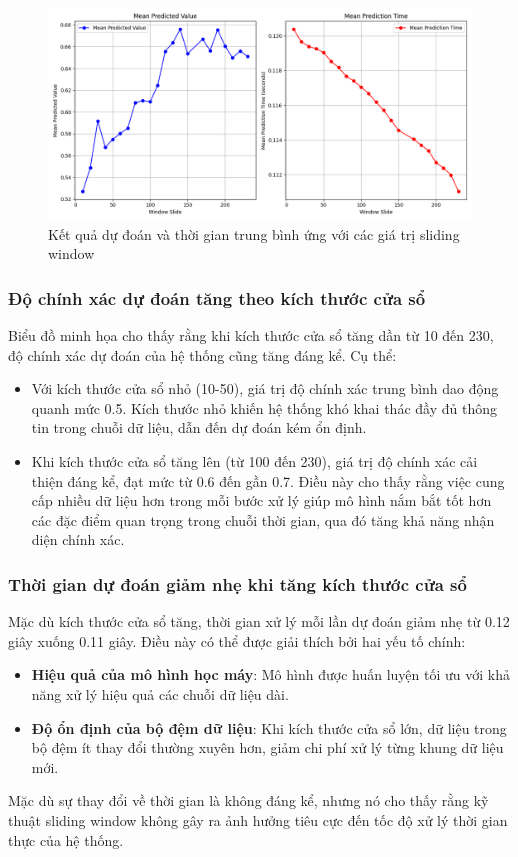 \begin{figure}[H]
    \centering
    \includegraphics[width=\textwidth,height=\textheight,keepaspectratio]{Images/Experimental results/Sliding Window.png}
    \caption{Kết quả dự đoán và thời gian trung bình ứng với các giá trị sliding window}
    \label{fig:enter-label}
\end{figure}


\subsubsection{Độ chính xác dự đoán tăng theo kích thước cửa sổ}

Biểu đồ minh họa cho thấy rằng khi kích thước cửa sổ tăng dần từ 10 đến 230, độ chính xác dự đoán của hệ thống cũng tăng đáng kể. Cụ thể: 
\begin{itemize}
    \item Với kích thước cửa sổ nhỏ (10-50), giá trị độ chính xác trung bình dao động quanh mức 0.5. Kích thước nhỏ khiến hệ thống khó khai thác đầy đủ thông tin trong chuỗi dữ liệu, dẫn đến dự đoán kém ổn định.  
    \item Khi kích thước cửa sổ tăng lên (từ 100 đến 230), giá trị độ chính xác cải thiện đáng kể, đạt mức từ 0.6 đến gần 0.7. Điều này cho thấy rằng việc cung cấp nhiều dữ liệu hơn trong mỗi bước xử lý giúp mô hình nắm bắt tốt hơn các đặc điểm quan trọng trong chuỗi thời gian, qua đó tăng khả năng nhận diện chính xác.
\end{itemize}

\subsubsection{Thời gian dự đoán giảm nhẹ khi tăng kích thước cửa sổ}

Mặc dù kích thước cửa sổ tăng, thời gian xử lý mỗi lần dự đoán giảm nhẹ từ 0.12 giây xuống 0.11 giây. Điều này có thể được giải thích bởi hai yếu tố chính:
\begin{itemize}
    \item \textbf{Hiệu quả của mô hình học máy}: Mô hình được huấn luyện tối ưu với khả năng xử lý hiệu quả các chuỗi dữ liệu dài. 
    \item \textbf{Độ ổn định của bộ đệm dữ liệu}: Khi kích thước cửa sổ lớn, dữ liệu trong bộ đệm ít thay đổi thường xuyên hơn, giảm chi phí xử lý từng khung dữ liệu mới.
\end{itemize}
Mặc dù sự thay đổi về thời gian là không đáng kể, nhưng nó cho thấy rằng kỹ thuật sliding window không gây ra ảnh hưởng tiêu cực đến tốc độ xử lý thời gian thực của hệ thống.

